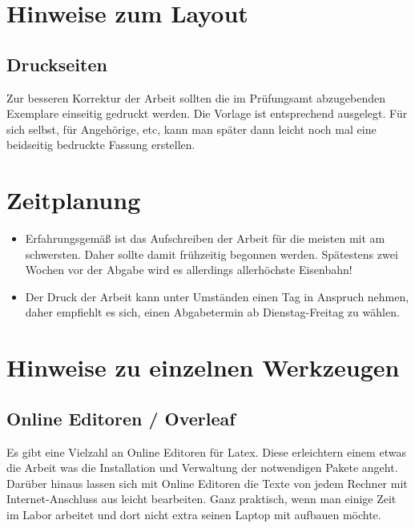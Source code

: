
\chapter{Hinweise zum Layout}

\section{Druckseiten}

Zur besseren Korrektur der Arbeit sollten die im Prüfungsamt abzugebenden Exemplare einseitig gedruckt werden. Die Vorlage ist entsprechend ausgelegt. Für sich selbst, für Angehörige, etc, kann man später dann leicht noch mal eine beidseitig bedruckte Fassung erstellen.

\chapter{Zeitplanung}

\begin{itemize}
\item Erfahrungsgemäß ist das Aufschreiben der Arbeit für die meisten mit am schwersten. Daher sollte damit frühzeitig begonnen werden. Spätestens zwei Wochen vor der Abgabe wird es allerdings allerhöchste Eisenbahn!
\item Der Druck der Arbeit kann unter Umständen einen Tag in Anspruch nehmen, daher empfiehlt es sich, einen Abgabetermin ab Dienstag-Freitag zu wählen.
\end{itemize}


\chapter{Hinweise zu einzelnen Werkzeugen}

\section{Online Editoren / Overleaf}

Es gibt eine Vielzahl an Online Editoren für Latex. Diese erleichtern einem etwas die Arbeit was die Installation und Verwaltung der notwendigen Pakete angeht. Darüber hinaus lassen sich mit Online Editoren die Texte von jedem Rechner mit Internet-Anschluss aus leicht bearbeiten. Ganz praktisch, wenn man einige Zeit im Labor arbeitet und dort nicht extra seinen Laptop mit aufbauen möchte.

